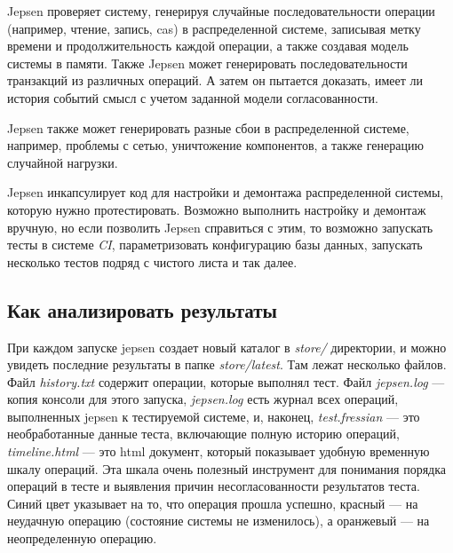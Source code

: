 \documentclass[14pt,  openany]{book}
\begin{document}
\par Jepsen проверяет систему, генерируя случайные последовательности операции (например, чтение, запись, cas) в распределенной системе, записывая метку времени и продолжительность каждой операции, а также создавая модель системы в памяти.  Также Jepsen может генерировать последовательности транзакций из различных операций. А затем он пытается доказать, имеет ли история событий смысл с учетом заданной модели согласованности.
\par Jepsen также может генерировать разные сбои в распределенной системе, например, проблемы с сетью, уничтожение компонентов, а также генерацию случайной нагрузки.
\par Jepsen инкапсулирует код для настройки и демонтажа распределенной системы, которую нужно протестировать. Возможно выполнить настройку и демонтаж вручную, но если позволить Jepsen справиться с этим, то возможно запускать тесты в системе \textit{CI}, параметризовать конфигурацию базы данных, запускать несколько тестов подряд с чистого листа и так далее.

\subsection{Как анализировать результаты}
При каждом запуске jepsen создает новый каталог в \textit{store/} директории, и можно увидеть последние результаты в папке \textit{store/latest}. Там лежат несколько файлов.  Файл \textit{history.txt} содержит операции, которые выполнял тест.  Файл \textit{jepsen.log} --- копия консоли для этого запуска, \textit{jepsen.log} есть журнал всех операций, выполненных jepsen к тестируемой системе, и, наконец, \textit{test.fressian} --- это необработанные данные теста, включающие полную историю операций, \textit{timeline.html} --- это html документ, который показывает удобную временную шкалу операций. Эта шкала очень полезный инструмент для понимания порядка операций в тесте и выявления причин несогласованности результатов теста. Синий цвет указывает на то, что операция прошла успешно, красный --- на неудачную операцию (состояние системы не изменилось), а оранжевый --- на неопределенную операцию.
\end{document}
